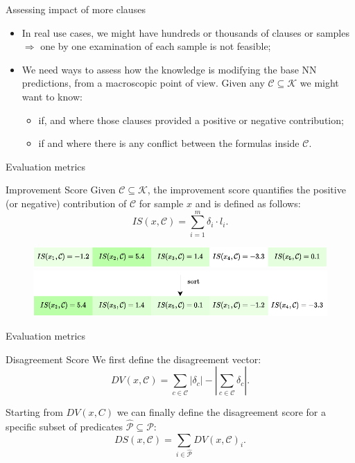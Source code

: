\documentclass{beamer}
\begin{document}
\begin{frame}{Assessing impact of more clauses}
	\begin{itemize}
		\item In real use cases, we might have hundreds or thousands of clauses or samples $\Rightarrow$ one by one examination of each sample is not feasible; \pause
		\item We need ways to assess how the knowledge is modifying the base NN predictions, from a macroscopic point of view. Given any $\mathcal{C} \subseteq \mathcal{K}$ we might want to know: \pause
		\begin{itemize}
			\item if, and where those clauses provided a positive or negative contribution;\pause
			\item if and where there is any conflict between the formulas inside $\mathcal{C}$.
		\end{itemize}
	\end{itemize}
\end{frame}

\begin{frame}{Evaluation metrics}
\begin{block}{Improvement Score}
	Given $\mathcal{C} \subseteq \mathcal{K}$, the improvement score quantifies the positive (or negative) contribution of $\mathcal{C}$ for sample $x$ and is defined as follows:
	$$I S(x, \mathcal{C})=\sum_{i=1}^{m} \delta_{i} \cdot l_{i}.$$
\end{block}

\pause
\begin{figure}
	\includegraphics[width=0.95\linewidth]{images/ordering_metrics0.pdf}\pause
	\vspace{10pt} 
	\includegraphics[width=0.95\linewidth]{images/ordering_metrics1.pdf}
\end{figure}
	
\end{frame}

\begin{frame}{Evaluation metrics}
	\begin{block}{Disagreement Score}
		We first define the disagreement vector:
		$$D V(x, \mathcal{C})=\sum_{c \in \mathcal{C}}\left|\delta_{c}\right|-\left|\sum_{c \in \mathcal{C}} \delta_{c}\right|.$$
		
		Starting from $DV(x,C)$ we can finally define the disagreement score for a specific subset of predicates $\hat{\mathcal{P}} \subseteq \mathcal{P}$:
		$$D S(x, \mathcal{C})=\sum_{i\in \hat{\mathcal{P}}} D V(x, \mathcal{C})_{i}.$$
	\end{block}


\end{frame}
\end{document}
